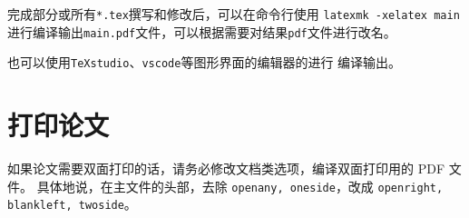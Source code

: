 
完成部分或所有\verb|*.tex|撰写和修改后，可以在命令行使用 \verb|latexmk -xelatex main|
进行编译输出\verb|main.pdf|文件，可以根据需要对结果\texttt{pdf}文件进行改名。

也可以使用\texttt{TeXstudio}、\texttt{vscode}等图形界面的编辑器的进行
编译输出。

\section{打印论文}

如果论文需要双面打印的话，请务必修改文档类选项，编译双面打印用的 PDF 文件。
具体地说，在主文件的头部，去除 \texttt{openany, oneside}，改成 \texttt{openright, blankleft, twoside}。

